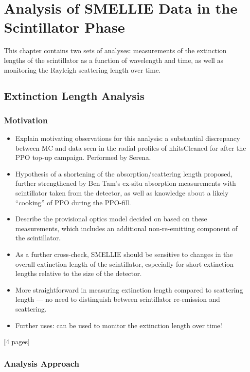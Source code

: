 \chapter{Analysis of SMELLIE Data in the Scintillator Phase}\label{chap:smellie_analysis}
{
    \color{blue}
    This chapter contains two sets of analyses: measurements of the extinction lengths of the scintillator as a function of wavelength and time, as well as monitoring the Rayleigh scattering length over time.

\section{Extinction Length Analysis}\label{sec:ext_length_analysis}
\subsection{Motivation}
\begin{itemize}
    \item Explain motivating observations for this analysis: a substantial discrepancy between MC and data seen in the radial profiles of nhitsCleaned for  after the PPO top-up campaign. Performed by Serena.
    \item Hypothesis of a shortening of the absorption/scattering length proposed, further strengthened by Ben Tam's ex-situ absorption measurements with scintillator taken from the detector, as well as knowledge about a likely ``cooking'' of PPO during the PPO-fill.
    \item Describe the provisional optics model decided on based on these measurements, which includes an additional non-re-emitting component of the scintillator.
    \item As a further cross-check, SMELLIE should be sensitive to changes in the overall extinction length of the scintillator, especially for short extinction lengths relative to the size of the detector.
    \item More straightforward in measuring extinction length compared to scattering length --- no need to distinguish between scintillator re-emission and scattering.
    \item Further uses: can be used to monitor the extinction length over time!
\end{itemize}
[4 pages]
\subsection{Analysis Approach}
}
